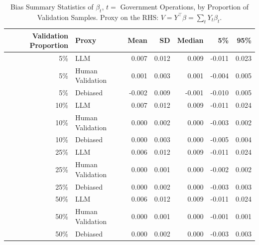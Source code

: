 \begin{table}

\caption{Bias Summary Statistics of $\beta_{t}$, $t=$ Government Operations, by Proportion of Validation Samples.
      Proxy on the RHS: $V = Y^\top \beta = \sum_{t} Y_t \beta_t$.}
\centering
\begin{tabular}[t]{rlrrrrr}
\toprule
Validation Proportion & Proxy & Mean & SD & Median & 5\% & 95\%\\
\midrule
5\% & LLM & 0.007 & 0.012 & 0.009 & -0.011 & 0.023\\
5\% & Human Validation & 0.001 & 0.003 & 0.001 & -0.004 & 0.005\\
5\% & Debiased & -0.002 & 0.009 & -0.001 & -0.010 & 0.005\\
10\% & LLM & 0.007 & 0.012 & 0.009 & -0.011 & 0.024\\
10\% & Human Validation & 0.000 & 0.002 & 0.000 & -0.003 & 0.002\\
10\% & Debiased & 0.000 & 0.003 & 0.000 & -0.005 & 0.004\\
25\% & LLM & 0.006 & 0.012 & 0.009 & -0.011 & 0.024\\
25\% & Human Validation & 0.000 & 0.001 & 0.000 & -0.002 & 0.002\\
25\% & Debiased & 0.000 & 0.002 & 0.000 & -0.003 & 0.003\\
50\% & LLM & 0.006 & 0.012 & 0.009 & -0.011 & 0.024\\
50\% & Human Validation & 0.000 & 0.001 & 0.000 & -0.001 & 0.001\\
50\% & Debiased & 0.000 & 0.002 & 0.000 & -0.003 & 0.003\\
\bottomrule
\end{tabular}
\end{table}
